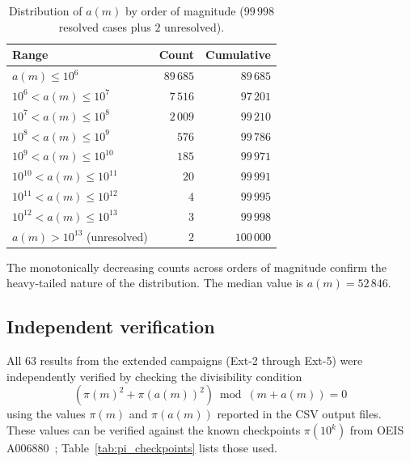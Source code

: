 \documentclass{amsart}
\theoremstyle{definition}
\theoremstyle{remark}
\numberwithin{equation}{section}
\begin{document}
\begin{table}[ht]
\centering
\caption{Distribution of $a(m)$ by order of magnitude
($99\,998$ resolved cases plus $2$ unresolved).}
\label{tab:distribution}
\begin{tabular}{lrr}
\toprule
Range & Count & Cumulative \\
\midrule
$a(m) \le 10^6$     & $89\,685$ & $89\,685$ \\
$10^6 < a(m) \le 10^7$   & $7\,516$ & $97\,201$ \\
$10^7 < a(m) \le 10^8$   & $2\,009$ & $99\,210$ \\
$10^8 < a(m) \le 10^9$   & $576$ & $99\,786$ \\
$10^9 < a(m) \le 10^{10}$  & $185$ & $99\,971$ \\
$10^{10} < a(m) \le 10^{11}$ & $20$ & $99\,991$ \\
$10^{11} < a(m) \le 10^{12}$ & $4$ & $99\,995$ \\
$10^{12} < a(m) \le 10^{13}$ & $3$ & $99\,998$ \\
$a(m) > 10^{13}$ (unresolved) & $2$ & $100\,000$ \\
\bottomrule
\end{tabular}
\end{table}

The monotonically decreasing counts across orders of magnitude
confirm the heavy-tailed nature of the distribution.
The median value is $a(m) = 52\,846$.

\subsection{Independent verification}

All $63$ results from the extended campaigns (Ext-2 through Ext-5)
were independently verified by checking the divisibility condition
\begin{equation}\label{eq:verify}
(\pi(m)^2 + \pi(a(m))^2) \bmod (m + a(m)) = 0
\end{equation}
using the values $\pi(m)$ and $\pi(a(m))$ reported in the CSV
output files.  These values can be verified against the known
checkpoints $\pi(10^k)$ from OEIS A006880~\cite{OEIS_A006880};
Table~\ref{tab:pi_checkpoints} lists those used.
\end{document}
